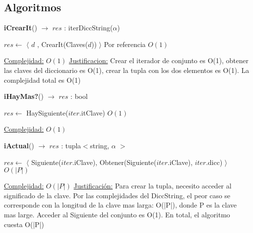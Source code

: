 \begin{Algoritmos}
\subsection{Algoritmos}


\begin{algorithm}[H]
{\textbf{iCrearIt}() $\to$ $res$ : iterDiccString($\alpha$)}
\begin{algorithmic}[1]

\State $res \gets$ $\langle$ $d$ , CrearIt(Claves($d$)) $\rangle$ \Comment Por referencia $O(1)$
 
\medskip
\Statex \underline{Complejidad:} $O(1)$
\Statex \underline{Justificacion:} Crear el iterador de conjunto es O(1), obtener las claves del diccionario es O(1), crear la tupla con los dos elementos es O(1). La complejidad total es O(1)
\end{algorithmic}
\end{algorithm}



\begin{algorithm}[H]
{\textbf{iHayMas?}() $\to$ $res$ : bool}
\begin{algorithmic}[1]

\State $res \gets$ HaySiguiente($iter$.itClave) \Comment $O(1)$

\medskip
\Statex \underline{Complejidad:} $O(1)$
\end{algorithmic}
\end{algorithm}



\begin{algorithm}[H]
{\textbf{iActual}() $\to$ $res$ : tupla$<$string, $\alpha$ $>$}
\begin{algorithmic}[1]

\State $res \gets$ $\langle$ Siguiente($iter$.iClave), Obtener(Siguiente($iter$.iClave), $iter$.dicc) $\rangle$ \Comment $O(|P|)$

\medskip
\Statex \underline{Complejidad:} $O(|P|)$
\Statex \underline{Justificaci\'on:} Para crear la tupla, necesito acceder al significado de la clave. Por las complejidades del DiccString, el peor caso se corresponde con la longitud de la clave mas larga: O(|P|), donde P es la clave mas large. Acceder al Siguiente del conjunto es O(1). En total, el algoritmo cuesta O(|P|)

\end{algorithmic}
\end{algorithm}



\end{Algoritmos}
